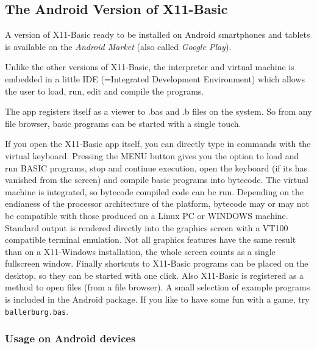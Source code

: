 \subsection{The Android Version of X11-Basic}

A version of X11-Basic ready to be installed on Android smartphones and tablets
is available on the {\it Android Market} (also called {\it Google Play}). 

Unlike the other versions of X11-Basic, the interpreter and virtual machine is
embedded in a little IDE (=Integrated Development Environment) which allows the
user to load, run, edit and compile the programs.

The app registers itself as a viewer to .bas and .b files on the system. So
from any file browser, basic programs can be started with a single touch. 

If you open the X11-Basic app itself, you can directly type in commands with
the virtual keyboard. Pressing the MENU button gives you the option to load and
run BASIC programs, stop and continue execution, open the keyboard (if its has
vanished from the screen) and compile basic programs into bytecode. The virtual
machine is integrated, so bytecode compiled code can be run. Depending on the
endianess of the processor architecture of the platform, bytecode may or may not
be compatible with those produced on a Linux PC or WINDOWS machine. Standard
output is rendered directly into the graphics screen with a VT100 compatible
terminal emulation. Not all graphics features have the same result than on a
X11-Windows installation, the whole screen counts as a single fullscreen
window. Finally shortcuts to X11-Basic programs can be placed on the desktop,
so they can be started with one click. Also X11-Basic is registered as a method
to open files (from a file browser).  A small selection of example programs is
included in the Android package. If you like to have some fun with a game, try
\verb|ballerburg.bas|.

\subsubsection{Usage on Android devices}

